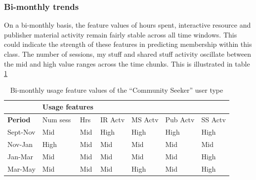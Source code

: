 \documentclass{acm_proc_article-sp}
\begin{document}
\subsubsection{Bi-monthly trends}
On a bi-monthly basis, the feature values of hours spent, interactive resource and publisher material activity remain fairly stable across all time windows. This could indicate the strength of these features in predicting membership within this class. The number of sessions, my stuff and shared stuff activity oscillate between the mid and high value ranges across the time chunks. This is illustrated in table \ref{cluster2bimonthly} 
\begin{table}
\caption{Bi-monthly usage feature values of the ``Community Seeker'' user type}
\label{cluster2bimonthly}
\begin{tabular}{|p{1.5cm}|p{0.6cm}|p{0.6cm}|p{0.6cm}|p{0.6cm}|p{0.8cm}|p{0.8cm}|}
& \multicolumn{2}{r}{\textbf{Usage features}}  \\ \hline
 \textbf{Period} 
 & Num sess & Hrs & IR Actv & MS Actv & Pub Actv & SS Actv \\ \hline
Sept-Nov & Mid & Mid  & High & High & High & High \\ \hline
Nov-Jan & High & Mid  & Mid & Mid & Mid & Mid \\ \hline
Jan-Mar & Mid & Mid  & Mid & Mid & Mid & High \\ \hline
Mar-May & Mid & Mid  & Mid & High & Mid & High \\ \hline
\end{tabular}
\end{table}
\end{document}
